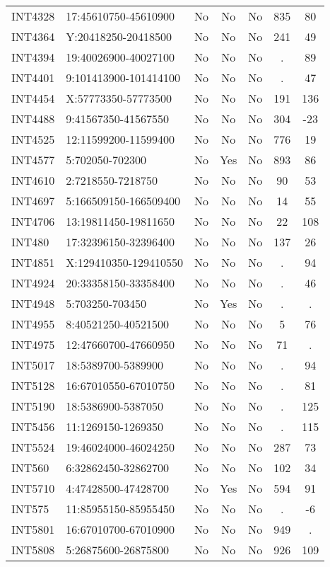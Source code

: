 \begin{longtable}{llccccc}
INT4328 & 17:45610750-45610900 & No & No & No & 835 & 80 \\
INT4364 & Y:20418250-20418500 & No & No & No & 241 & 49 \\
INT4394 & 19:40026900-40027100 & No & No & No & . & 89 \\
INT4401 & 9:101413900-101414100 & No & No & No & . & 47 \\
INT4454 & X:57773350-57773500 & No & No & No & 191 & 136 \\
INT4488 & 9:41567350-41567550 & No & No & No & 304 & -23 \\
INT4525 & 12:11599200-11599400 & No & No & No & 776 & 19 \\
INT4577 & 5:702050-702300 & No & Yes & No & 893 & 86 \\
INT4610 & 2:7218550-7218750 & No & No & No & 90 & 53 \\
INT4697 & 5:166509150-166509400 & No & No & No & 14 & 55 \\
INT4706 & 13:19811450-19811650 & No & No & No & 22 & 108 \\
INT480 & 17:32396150-32396400 & No & No & No & 137 & 26 \\
INT4851 & X:129410350-129410550 & No & No & No & . & 94 \\
INT4924 & 20:33358150-33358400 & No & No & No & . & 46 \\
INT4948 & 5:703250-703450 & No & Yes & No & . & . \\
INT4955 & 8:40521250-40521500 & No & No & No & 5 & 76 \\
INT4975 & 12:47660700-47660950 & No & No & No & 71 & . \\
INT5017 & 18:5389700-5389900 & No & No & No & . & 94 \\
INT5128 & 16:67010550-67010750 & No & No & No & . & 81 \\
INT5190 & 18:5386900-5387050 & No & No & No & . & 125 \\
INT5456 & 11:1269150-1269350 & No & No & No & . & 115 \\
INT5524 & 19:46024000-46024250 & No & No & No & 287 & 73 \\
INT560 & 6:32862450-32862700 & No & No & No & 102 & 34 \\
INT5710 & 4:47428500-47428700 & No & Yes & No & 594 & 91 \\
INT575 & 11:85955150-85955450 & No & No & No & . & -6 \\
INT5801 & 16:67010700-67010900 & No & No & No & 949 & . \\
INT5808 & 5:26875600-26875800 & No & No & No & 926 & 109 \\

\end{longtable}
